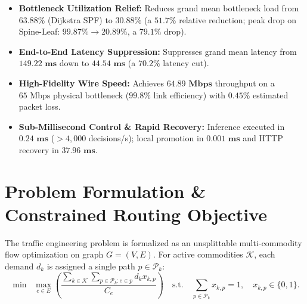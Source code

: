 \documentclass[10pt,a4paper]{article}
\begin{document}
\begin{tcolorbox}[colframe=winrate,colback=winrate!5!white,title=\textbf{Key Empirical Breakthroughs (Verified Across 5 Fabrics \& 120 Mininet Emulation Trials)}]
\footnotesize
\begin{itemize}[noitemsep,topsep=1pt,leftmargin=*]
  \item \textbf{Bottleneck Utilization Relief:} Reduces grand mean bottleneck load from $\mathbf{63.88\%}$ (Dijkstra SPF) to $\mathbf{30.88\%}$ (a $\mathbf{51.7\%}$ relative reduction; peak drop on Spine-Leaf: $99.87\% \to 20.89\%$, a $\mathbf{79.1\%}$ drop).
  \item \textbf{End-to-End Latency Suppression:} Suppresses grand mean latency from $\mathbf{149.22\text{ ms}}$ down to $\mathbf{44.54\text{ ms}}$ (a $\mathbf{70.2\%}$ latency cut).
  \item \textbf{High-Fidelity Wire Speed:} Achieves $\mathbf{64.89\text{ Mbps}}$ throughput on a $65\text{ Mbps}$ physical bottleneck ($\mathbf{99.8\%}$ link efficiency) with $\mathbf{0.45\%}$ estimated packet loss.
  \item \textbf{Sub-Millisecond Control \& Rapid Recovery:} Inference executed in $\mathbf{0.24\text{ ms}}$ ($>4{,}000$ decisions/s); local promotion in $\mathbf{0.001\text{ ms}}$ and HTTP recovery in $\mathbf{37.96\text{ ms}}$.
\end{itemize}
\end{tcolorbox}

\section{Problem Formulation \& Constrained Routing Objective}
The traffic engineering problem is formalized as an unsplittable multi-commodity flow optimization on graph $G=(V, E)$. For active commodities $\mathcal{K}$, each demand $d_k$ is assigned a single path $p \in \mathcal{P}_k$:
\begin{equation}
\label{eq:handout_obj}
\min \;\; \max_{e \in E} \left( \frac{\sum_{k \in \mathcal{K}} \sum_{p \in \mathcal{P}_k : e \in p} d_k x_{k, p}}{C_e} \right) \quad \text{s.t.} \quad \sum_{p \in \mathcal{P}_k} x_{k, p} = 1, \quad x_{k, p} \in \{0, 1\}.
\end{equation}
\end{document}
